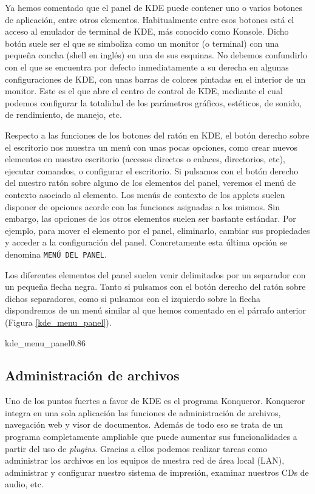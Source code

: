 Ya hemos  comentado que  el panel  de {\sf KDE}  puede contener  uno o
varios  botones de  aplicación, entre  otros elementos.  Habitualmente
entre esos  botones está  el acceso  al emulador  de terminal  de {\sf
KDE}, más conocido como {\sf Konsole}. Dicho botón suele ser el que se
simboliza como un  monitor (o terminal) con una  pequeña concha (shell
en inglés) en  una de sus esquinas. No debemos  confundirlo con el que
se  encuentra  por defecto  inmediatamente  a  su derecha  en  algunas
configuraciones de {\sf  KDE}, con unas barras de  colores pintadas en
el interior de un monitor. Este es el que abre el centro de control de
{\sf KDE},  mediante el  cual podemos configurar  la totalidad  de los
parámetros gráficos, estéticos, de  sonido, de rendimiento, de manejo,
etc.

Respecto a  las funciones de  los botones del  ratón en {\sf  KDE}, el
botón derecho sobre  el escritorio nos muestra un menú  con unas pocas
opciones, como  crear nuevos elementos en  nuestro escritorio (accesos
directos o enlaces, directorios, etc), ejecutar comandos, o configurar
el  escritorio. Si  pulsamos con  el botón  derecho del  nuestro ratón
sobre alguno de  los elementos del panel, veremos el  menú de contexto
asociado  al elemento.  Los menús  de contexto  de los  applets suelen
disponer  de  opciones  acorde  con  las  funciones  asignadas  a  los
mismos. Sin  embargo, las opciones  de los otros elementos  suelen ser
bastante estándar. Por  ejemplo, para mover el elemento  por el panel,
eliminarlo, cambiar sus  propiedades y acceder a  la configuración del
panel.  Concretamente esta  última opción  se denomina  {\tt MENÚ  DEL
PANEL}.

Los diferentes  elementos del  panel suelen  venir delimitados  por un
separador con un pequeña flecha negra.  Tanto si pulsamos con el botón
derecho del  ratón sobre dichos  separadores, como si pulsamos  con el
izquierdo sobre la flecha dispondremos de un menú similar al que hemos
comentado en el párrafo anterior (Figura \ref{kde_menu_panel}).

\begin{figura}{kde_menu_panel}{0.86}
\caption{Menú del panel de {\sf KDE}}
\label{kde_menu_panel}
\end{figura}


\subsection{Administración de archivos}

Uno de  los puntos fuertes  a favor de {\sf  KDE} es el  programa {\sf
Konqueror}. {\sf  Konqueror} integra en  una sola
aplicación las funciones de administración de archivos, navegación web
y visor  de documentos.  Además de  todo eso se  trata de  un programa
completamente  ampliable  que  puede aumentar  sus  funcionalidades  a
partir  del uso  de {\em  plugins}. Gracias  a ellos  podemos realizar
tareas como  administrar los  archivos en los  equipos de  nuestra red
de  área local  (LAN),  administrar y  configurar  nuestro sistema  de
impresión, examinar nuestros CDs de audio, etc.

